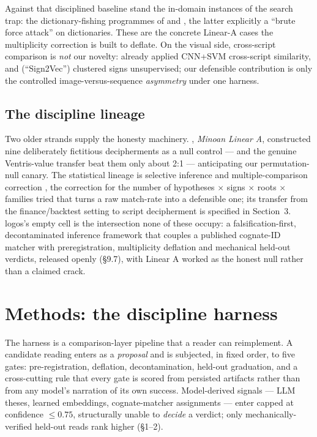 Against that disciplined baseline stand the in-domain instances of the
search trap: the dictionary-fishing programmes of \citet{eu2019} and
\citet{loh2020}, the latter explicitly a ``brute force attack'' on
dictionaries. These are the concrete Linear-A cases the multiplicity
correction is built to deflate. On the visual side, cross-script
comparison is \emph{not} our novelty: \citet{daggumati2019, daggumati2023}
already applied CNN+SVM cross-script similarity, and \citet{corazza2022}
(``Sign2Vec'') clustered signs unsupervised; our defensible contribution
is only the controlled image-versus-sequence \emph{asymmetry} under one
harness.

\subsection{The discipline lineage}

Two older strands supply the honesty machinery. \citet{packard1974},
\emph{Minoan Linear A}, constructed nine deliberately fictitious
decipherments as a null control --- and the genuine Ventris-value transfer
beat them only about 2:1 --- anticipating our permutation-null canary. The
statistical lineage is selective inference and multiple-comparison
correction \citep{bailey2014}, the correction for the number of
hypotheses $\times$ signs $\times$ roots $\times$ families tried that
turns a raw match-rate into a defensible one; its transfer from the
finance/backtest setting to script decipherment is specified in
Section~3. logos's empty cell is the intersection none of these occupy: a
falsification-first, decontaminated inference framework that couples a
published cognate-ID matcher \citep[reporting the Luo 2019
metric]{tamburini2025} with preregistration, multiplicity deflation and
mechanical held-out verdicts, released openly (\S9.7), with Linear A
worked as the honest null rather than a claimed crack.

\section{Methods: the discipline harness}

The harness is a comparison-layer pipeline that a reader can reimplement.
A candidate reading enters as a \emph{proposal} and is subjected, in fixed
order, to five gates: pre-registration, deflation, decontamination,
held-out graduation, and a cross-cutting rule that every gate is scored
from persisted artifacts rather than from any model's narration of its own
success. Model-derived signals --- LLM theses, learned embeddings,
cognate-matcher assignments --- enter capped at confidence $\le 0.75$,
structurally unable to \emph{decide} a verdict; only
mechanically-verified held-out reads rank higher (\S1--2).

